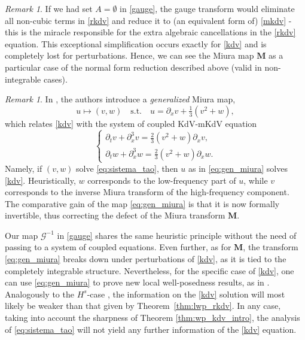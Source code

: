 \documentclass[a4paper,
11pt,  reqno]{amsart}
\newcommand{\5}{\textup{V}}
\newcommand{\noi}{\noindent}
\newcommand{\dx}{\partial_x}
\newcommand{\dt}{\partial_t}
\theoremstyle{remark}
\newtheorem{remark}[theorem]{Remark}
\newcommand{\MMb}{\mathbf{M}}
\newcommand{\Gc}{\mathcal{G}}
\numberwithin{equation}{section}
\numberwithin{theorem}{section}
\begin{document}
        \begin{remark}\label{remark:miura}
If we had set $A=\emptyset$ in \eqref{gauge}, the gauge transform would eliminate all non-cubic terms in \eqref{rkdv} and reduce it to (an equivalent form of) \eqref{mkdv} - this is the miracle responsible for the extra algebraic cancellations in the \eqref{rkdv} equation. This exceptional simplification occurs exactly for \eqref{kdv} and is completely lost for perturbations.
Hence, we can see the Miura map $\MMb$ as a particular case of the normal form reduction described above (valid in non-integrable cases).


        \end{remark}

\begin{remark}
In \cite{CCT_ill}, the authors introduce a \emph{generalized} Miura map,
\begin{equation}\label{eq:gen_miura}
u\mapsto (v,w)\quad \mbox{s.t.}\quad u=\dx v + \tfrac13(v^2 + w),
\end{equation}
which relates \eqref{kdv} with the system of coupled KdV-mKdV equation
\begin{equation}\label{eq:sistema_tao}
\begin{cases}
\dt v + \dx^3 v = \tfrac23 (v^2 + w)\dx v,
\\
\dt w + \dx^3 w = \tfrac23 (v^2 + w)\dx w
.
\end{cases}
\end{equation}
Namely, if $(v,w)$ solve \eqref{eq:sistema_tao}, then $u$ as in \eqref{eq:gen_miura} solves \eqref{kdv}.
Heuristically, $w$ corresponds to the low-frequency part of $u$, while $v$ corresponds to the inverse Miura transform of the high-frequency component.
The comparative gain of the map \eqref{eq:gen_miura} is that it is now formally invertible, thus correcting the defect of the Miura transform $\MMb$.

\noi
Our map $\Gc^{-1}$ in \eqref{gauge} shares the same heuristic principle without the need of passing to a system of coupled equations. Even further, as for $\MMb$, the transform \eqref{eq:gen_miura} breaks down under perturbations of \eqref{kdv}, as it is tied to the completely integrable structure.
Nevertheless, for the specific case of \eqref{kdv}, one can use \eqref{eq:gen_miura} to prove new local well-posedness results, as in \cite{CCT_ill}. Analogously to the $H^s$-case \cite{Guo_gwp, Kishimoto_lwp_crit}, the information on the \eqref{kdv} solution will most likely be weaker than that given by Theorem~\ref{thm:lwp_rkdv}. In any case, taking into account the sharpness of Theorem \ref{thm:wp_kdv_intro}, the analysis of \eqref{eq:sistema_tao} will not yield any further information of the \eqref{kdv} equation.



\end{remark}
\end{document}
